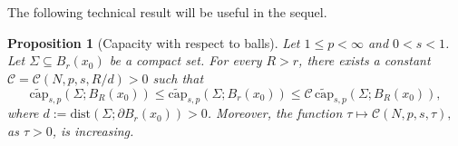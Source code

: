 \documentclass{amsart}
\newtheorem{proposition}[theorem]{Proposition}
\theoremstyle{definition}
\numberwithin{equation}{section}
\begin{document}
The following technical result will be useful in the sequel. 
\begin{proposition}[Capacity with respect to balls] \label{prop:cap-wrt-balls}
	Let $1 \le p < \infty$ and $0 < s < 1$. Let $\Sigma \subseteq B_r(x_0)$ be a compact set. For every $R > r$, there exists a constant $\mathscr{C} = \mathscr{C}(N, p, s, R/d) > 0$ such that  
	\begin{equation} \label{capacity-wrt-balls}
		\widetilde{\mathrm{cap}}_{s,p}\left(\Sigma; B_R(x_0)\right) \leq \widetilde{\mathrm{cap}}_{s,p}\left(\Sigma; B_r(x_0)\right) \leq \mathscr{C}\,\widetilde{\mathrm{cap}}_{s,p}\left(\Sigma; B_R(x_0)\right),
	\end{equation}
	where $d := \mathrm{dist}(\Sigma; \partial B_r(x_0)) > 0$. Moreover, the function $\tau \mapsto \mathscr{C}(N, p, s, \tau),$ as $\tau > 0$, is increasing. 
\end{proposition} 
\end{document}
